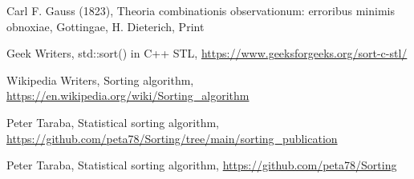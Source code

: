 \documentclass[12pt]{article}
\begin{document}
\begin{thebibliography}{9}
Carl F. Gauss (1823), Theoria combinationis observationum: erroribus minimis obnoxiae, Gottingae, H. Dieterich, Print

Geek Writers, std::sort() in C++ STL, \url{https://www.geeksforgeeks.org/sort-c-stl/}

Wikipedia Writers, Sorting algorithm, \url{https://en.wikipedia.org/wiki/Sorting_algorithm}

Peter Taraba, Statistical sorting algorithm, \url{https://github.com/peta78/Sorting/tree/main/sorting_publication}

Peter Taraba, Statistical sorting algorithm, \url{https://github.com/peta78/Sorting}

\end{thebibliography}

	
	
\end{document}
